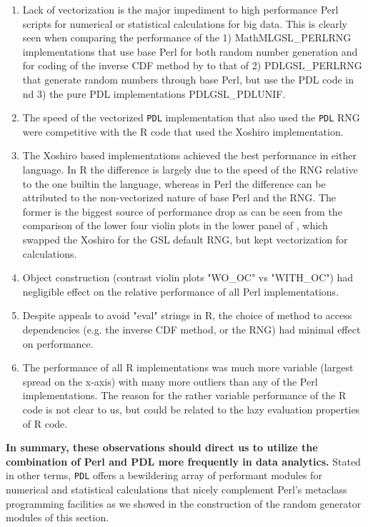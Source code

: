 \documentclass[10pt]{article}
\begin{document}
\begin{enumerate}
\item Lack of vectorization is the major impediment to high performance Perl scripts for numerical or statistical calculations for big data. This is clearly seen when comparing the performance of the 1) MathMLGSL\_PERLRNG implementations that use base Perl for  both random number generation and for coding of the inverse CDF method by  to that of 2) PDLGSL\_PERLRNG that generate random numbers through base Perl, but use the PDL code in  nd 3) the pure PDL implementations PDLGSL\_PDLUNIF.  
\item The speed of the vectorized \texttt{PDL} implementation that also used the \texttt{PDL} RNG were competitive with the R code that used the Xoshiro implementation.
\item The Xoshiro based implementations achieved the best performance in either language. In R the difference is largely due to the speed of the RNG relative to the one builtin the language, whereas in Perl the difference can be attributed to the non-vectorized nature of base Perl and the RNG. The former is the biggest source of performance drop as can be seen from the comparison of the lower four violin plots in the lower panel of , which swapped the Xoshiro for the GSL default RNG, but kept vectorization for calculations. 
\item Object construction (contrast violin plots "WO\_OC" vs "WITH\_OC") had negligible effect on the relative performance of all Perl implementations. 
\item Despite appeals to avoid "eval" strings in R, the choice of method to access dependencies (e.g. the inverse CDF method, or the RNG) had minimal effect on performance. 
\item The performance of all R implementations was much more variable (largest spread on the x-axis) with many more outliers than any of the Perl implementations. The reason for the rather variable performance of the R code is not clear to us, but could be related to the lazy evaluation properties of R code.  
\end{enumerate}
\textbf{In summary, these observations should direct us to utilize the combination of Perl and PDL more frequently in data analytics.} Stated in other terms,  \texttt{PDL} offers a bewildering array of performant modules for numerical and statistical calculations that nicely complement Perl's metaclass programming facilities as we showed in the construction of the random generator modules of this section. 
\end{document}
